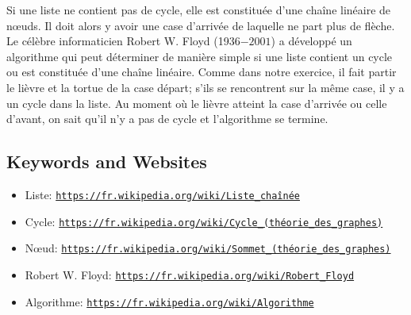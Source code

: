 \documentclass[a4paper,11pt]{report}
\newcommand{\BrochureUrlText}[1]{\texttt{#1}}
\newcommand{\taskGraphicsFolder}{..}
\begin{document}
{\centering%
\par}

{\centering%
\par}

Si une liste ne contient pas de cycle, elle est constituée d’une chaîne linéaire de nœuds. Il doit alors y avoir une case d’arrivée de laquelle ne part plus de flèche. Le célèbre informaticien Robert W. Floyd (1936$-2001$) a développé un algorithme qui peut déterminer de manière simple si une liste contient un cycle ou est constituée d’une chaîne linéaire. Comme dans notre exercice, il fait partir le lièvre et la tortue de la case départ; s’ils se rencontrent sur la même case, il y a un cycle dans la liste. Au moment où le lièvre atteint la case d’arrivée ou celle d’avant, on sait qu’il n’y a pas de cycle et l’algorithme se termine.

{\raggedright

\subsection*{Keywords and Websites}

\begin{itemize}
  \item Liste: \href{https://fr.wikipedia.org/wiki/Liste_cha\%C3\%AEn\%C3\%A9e}{\BrochureUrlText{https://fr.wikipedia.org/wiki/Liste\_chaînée}}
  \item Cycle: \href{https://fr.wikipedia.org/wiki/Cycle_(th\%C3\%A9orie_des_graphes)}{\BrochureUrlText{https://fr.wikipedia.org/wiki/Cycle\_(théorie\_des\_graphes)}}
  \item Nœud: \href{https://fr.wikipedia.org/wiki/Sommet_(th\%C3\%A9orie_des_graphes)}{\BrochureUrlText{https://fr.wikipedia.org/wiki/Sommet\_(théorie\_des\_graphes)}}
  \item Robert W. Floyd: \href{https://fr.wikipedia.org/wiki/Robert_Floyd}{\BrochureUrlText{https://fr.wikipedia.org/wiki/Robert\_Floyd}}
  \item Algorithme: \href{https://fr.wikipedia.org/wiki/Algorithme}{\BrochureUrlText{https://fr.wikipedia.org/wiki/Algorithme}}
\end{itemize}


}
\end{document}
